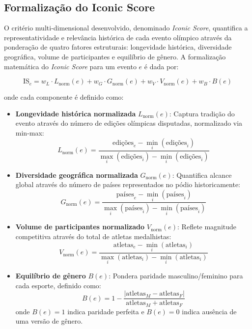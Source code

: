 \subsection{Formalização do Iconic Score}
\label{sec:iconic_score}

O critério multi-dimensional desenvolvido, denominado \textit{Iconic Score}, quantifica a representatividade e relevância histórica de cada evento olímpico através da ponderação de quatro fatores estruturais: longevidade histórica, diversidade geográfica, volume de participantes e equilíbrio de gênero. A formalização matemática do \textit{Iconic Score} para um evento $e$ é dada por:

\begin{equation}
\text{IS}_e = w_L \cdot L_{\text{norm}}(e) + w_G \cdot G_{\text{norm}}(e) + w_V \cdot V_{\text{norm}}(e) + w_B \cdot B(e)
\label{eq:iconic_score}
\end{equation}

onde cada componente é definido como:

\begin{itemize}
    \item \textbf{Longevidade histórica normalizada} $L_{\text{norm}}(e)$: Captura tradição do evento através do número de edições olímpicas disputadas, normalizado via min-max:
    \[
    L_{\text{norm}}(e) = \frac{\text{edições}_e - \min_i(\text{edições}_i)}{\max_i(\text{edições}_i) - \min_i(\text{edições}_i)}
    \]

    \item \textbf{Diversidade geográfica normalizada} $G_{\text{norm}}(e)$: Quantifica alcance global através do número de países representados no pódio historicamente:
    \[
    G_{\text{norm}}(e) = \frac{\text{países}_e - \min_i(\text{países}_i)}{\max_i(\text{países}_i) - \min_i(\text{países}_i)}
    \]

    \item \textbf{Volume de participantes normalizado} $V_{\text{norm}}(e)$: Reflete magnitude competitiva através do total de atletas medalhistas:
    \[
    V_{\text{norm}}(e) = \frac{\text{atletas}_e - \min_i(\text{atletas}_i)}{\max_i(\text{atletas}_i) - \min_i(\text{atletas}_i)}
    \]

    \item \textbf{Equilíbrio de gênero} $B(e)$: Pondera paridade masculino/feminino para cada esporte, definido como:
    \[
    B(e) = 1 - \frac{|\text{atletas}_M - \text{atletas}_F|}{\text{atletas}_M + \text{atletas}_F}
    \]
    onde $B(e) = 1$ indica paridade perfeita e $B(e) = 0$ indica ausência de uma versão de gênero.
\end{itemize}

